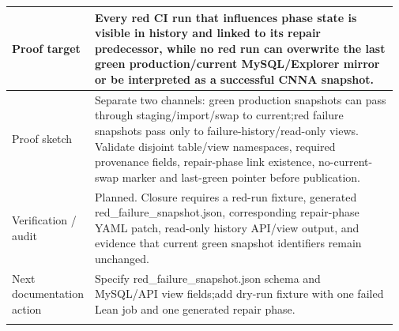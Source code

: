 \begin{longtable}{L{0.16\linewidth} L{0.81\linewidth}}
\hline\addlinespace[0.20em]
Proof target & Every red CI run that influences phase state is visible in history and linked to its repair predecessor, while no red run can overwrite the last green production/\allowbreak{}current MySQL/\allowbreak{}Explorer mirror or be interpreted as a successful CNNA snapshot.\\
\hline\addlinespace[0.20em]
Proof sketch & Separate two channels: green production snapshots can pass through staging/\allowbreak{}import/\allowbreak{}swap to current;\newline red failure snapshots pass only to failure-history/\allowbreak{}read-only views. Validate disjoint table/\allowbreak{}view namespaces, required provenance fields, repair-phase link existence, no-current-swap marker and last-green pointer before publication.\\
\hline\addlinespace[0.20em]
Verification /\allowbreak{} audit & Planned. Closure requires a red-run fixture, generated red\_failure\_snapshot.json, corresponding repair-phase YAML patch, read-only history API/\allowbreak{}view output, and evidence that current green snapshot identifiers remain unchanged.\\
\hline\addlinespace[0.20em]
Next documentation action & Specify red\_failure\_snapshot.json schema and MySQL/\allowbreak{}API view fields;\newline add dry-run fixture with one failed Lean job and one generated repair phase.\\
\hline\addlinespace[0.20em]
\end{longtable}
